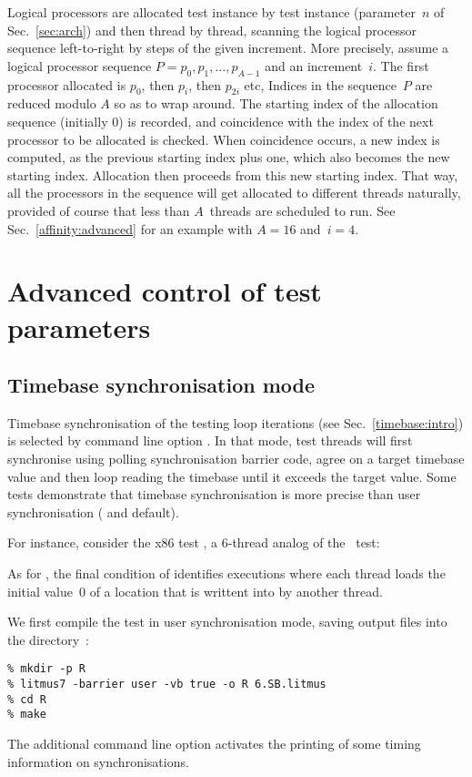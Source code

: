 \label{incr:full}Logical processors are allocated
test instance by test instance
(parameter~$n$ of Sec.~\ref{sec:arch}) and then
thread by thread, scanning the logical processor sequence
left-to-right by steps of the given increment.
More precisely, assume a logical processor sequence
$P = p_0, p_1, \ldots, p_{A-1}$ and an increment~$i$.
The first processor allocated is $p_0$, then $p_i$, then $p_{2i}$ etc,
Indices in the sequence~$P$ are reduced modulo $A$ so as to wrap around.
The starting index of the allocation sequence (initially $0$) is recorded,
and coincidence with the index of the next processor to be
allocated is checked.
When coincidence occurs, a new index is computed, as the previous
starting index plus one, which also becomes the new starting index.
Allocation then proceeds from this new starting index.
That way, all the processors in the sequence
will get allocated to different threads naturally, provided of
course that less than $A$~threads are scheduled to run.
See Sec.~\ref{affinity:advanced} for an example with $A=16$ and~$i=4$.

\section{Advanced\label{advanced:control} control of test parameters}

\subsection{Timebase \label{timebase}synchronisation mode}
Timebase synchronisation of the testing loop iterations
(see Sec.~\ref{timebase:intro}) is selected by \litmus{} command line option
.
In that mode,
test threads will first synchronise using polling synchronisation
barrier code, agree on a target timebase value and then loop
reading the timebase until it exceeds the target value.
Some tests demonstrate that timebase synchronisation
is more precise than user synchronisation ( and default).

For instance, consider the x86 test ,
a 6-thread analog of the ~test:

As for , the final condition of
 identifies executions where each thread loads the initial
value~$0$ of a location that is writtent into by another thread.
\begin{center}\end{center}

We first compile the test in user synchronisation mode, saving
\litmus{} output files into the directory~:
\begin{verbatim}
% mkdir -p R
% litmus7 -barrier user -vb true -o R 6.SB.litmus
% cd R
% make
\end{verbatim}
The additional command line option  activates the printing
of some timing information on synchronisations.


